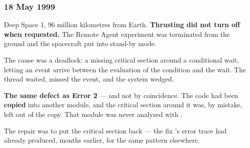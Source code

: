 \begin{frame}
  \frametitle{18 May 1999} \small

Deep Space 1, 96 million kilometres from Earth. {\bf Thrusting did not turn off
when requested.} The Remote Agent experiment was terminated from the ground and
the spacecraft put into stand-by mode.

\pause
\vspace{0.3cm}

The cause was a deadlock: a missing critical section around a conditional wait,
letting an event arrive between the evaluation of the condition and the wait. The
thread waited, missed the event, and the system wedged.

\pause
\vspace{0.3cm}

\begin{block}{}\small
{\bf The same defect as Error 2} --- and not by coincidence. The code had been
{\bf copied} into another module, and the critical section around it was, by
mistake, left out of the copy. That module was never analyzed with \spin{}.

\vspace{0.15cm}

The repair was to put the critical section back --- the fix \spin{}'s error trace
had already produced, months earlier, for the same pattern elsewhere.
\end{block}

\end{frame}

